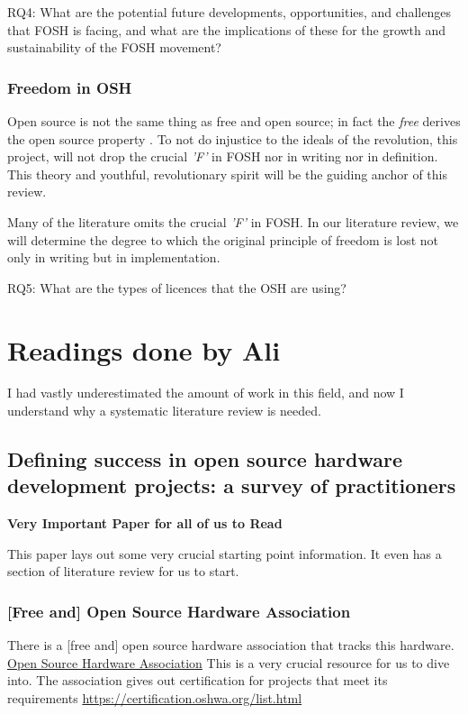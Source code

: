 \documentclass{article}
\begin{document}
RQ4: What are the potential future developments, opportunities, and challenges that FOSH is facing, and what are the implications of these for the growth and sustainability of the FOSH movement?

\subsubsection{Freedom in OSH}
Open source is not the same thing as free and open source; in fact the \textit{free} derives the open source property \cite{b0_stallman}. 
To not do injustice to the ideals of the revolution, this project, will not drop the crucial \textit{'F'} in FOSH nor in writing nor in definition.
This theory and youthful, revolutionary spirit will be the guiding anchor of this review.

Many of the literature omits the crucial \textit{'F'} in FOSH.
In our literature review, we will determine the degree to which the original principle of freedom is lost not only in writing but in implementation.

RQ5: What are the types of licences that the OSH are using?

\section{Readings done by Ali}

I had vastly underestimated the amount of work in this field, and now I understand why a systematic literature review is needed.

\subsection{Defining success in open source hardware development projects: a survey of practitioners}
\cite{p1_def_succ}

\textbf{Very Important Paper for all of us to Read}

This paper lays out some very crucial starting point information.
It even has a section of literature review for us to start.

\subsubsection{[Free and] Open Source Hardware Association}
There is a [free and] open source hardware association that tracks this hardware.
\href{https://www.oshwa.org}{Open Source Hardware Association}
This is a very crucial resource for us to dive into. 
The association gives out certification for projects that meet its requirements
\href{https://certification.oshwa.org/list.html}{https://certification.oshwa.org/list.html}
\end{document}
